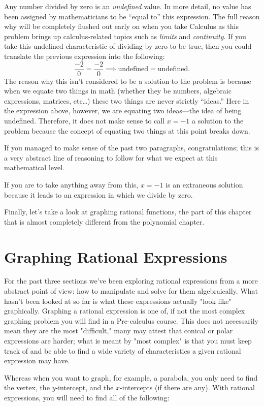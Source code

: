 \documentclass[lang=en,11pt]{elegantbook}
\begin{document}
Any number divided by zero is an \textit{undefined} value. In more detail, no value has been assigned by mathematicians to be “equal to” this expression. The full reason why will be completely flushed out early on when you take Calculus as this problem brings up calculus-related topics such as \textit{limits} and \textit{continuity}. If you take this undefined characteristic of dividing by zero to be true, then you could translate the previous expression into the following: $$\dfrac{-2}{0}=\dfrac{-2}{0} \implies \text{undefined}=\text{undefined}.$$
The reason why this isn't considered to be a solution to the problem is because when we equate two things in math (whether they be numbers, algebraic expressions, matrices, etc…) these two things are never strictly “ideas.” Here in the expression above, however, we are equating two ideas—the idea of being undefined. Therefore, it does not make sense to call $x=-1$ a solution to the problem because the concept of equating two things at this point breaks down.

If you managed to make sense of the past two paragraphs, congratulations; this is a very abstract line of reasoning to follow for what we expect at this mathematical level. 
\begin{note}
If you are to take anything away from this, $x=-1$ is an extraneous solution because it leads to an expression in which we divide by zero. 
\end{note}
Finally, let's take a look at graphing rational functions, the part of this chapter that is almost completely different from the polynomial chapter.
\section{Graphing Rational Expressions}
\noindent For the past three sections we've been exploring rational expressions from a more abstract point of view: how to manipulate and solve for them algebraically. What hasn't been looked at so far is what these expressions actually "look like" graphically. Graphing a rational expression is one of, if not the most complex graphing problem you will find in a Pre-calculus course. This does not necessarily mean they are the most "difficult," many may attest that conical or polar expressions are harder; what is meant by "most complex" is that you must keep track of and be able to find a wide variety of characteristics a given rational expression may have.

Whereas when you want to graph, for example, a parabola, you only need to find the vertex, the $y$-intercept, and the $x$-intercepts (if there are any). With rational expressions, you will need to find all of the following: 
\end{document}
